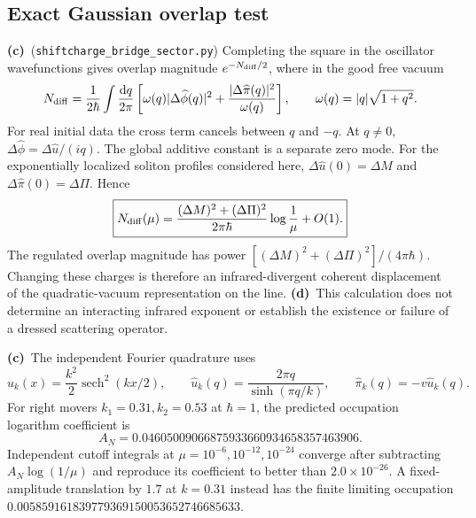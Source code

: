 \documentclass[11pt,a4paper]{article}
\newcommand{\C}{\textbf{(c)}\ }
\newcommand{\D}{\textbf{(d)}\ }
\newcommand{\dd}{\mathrm d}
\newcommand{\file}[1]{\nolinkurl{#1}}
\newcommand{\scs}{\file{shiftcharge_bridge_sector.py}}
\begin{document}
\subsection{Exact Gaussian overlap test}
\C (\scs) Completing the square in the oscillator wavefunctions
gives overlap magnitude $e^{-N_{\rm diff}/2}$, where in the good free
vacuum
\begin{equation}
 N_{\rm diff}=\frac1{2\hbar}\int\frac{\dd q}{2\pi}
 \left[\omega(q)|\Delta\widehat\phi(q)|^2+
 \frac{|\Delta\widehat\pi(q)|^2}{\omega(q)}\right],
 \qquad \omega(q)=|q|\sqrt{1+q^2}.
 \label{occupation}
\end{equation}
For real initial data the cross term cancels between $q$ and $-q$.
At $q\ne0$, $\Delta\widehat\phi=\Delta\widehat u/(iq)$.
The global additive constant is a separate zero mode.
For the exponentially localized soliton profiles considered here,
$\Delta\widehat u(0)=\Delta M$ and
$\Delta\widehat\pi(0)=\Delta\Pi$. Hence
\begin{equation}
 \boxed{
 N_{\rm diff}(\mu)=
 \frac{(\Delta M)^2+(\Delta\Pi)^2}{2\pi\hbar}
 \log\frac1\mu+O(1).}
 \label{ir-log}
\end{equation}
The regulated overlap magnitude has power
$[(\Delta M)^2+(\Delta\Pi)^2]/(4\pi\hbar)$.
Changing these charges is therefore an infrared-divergent coherent
displacement of the quadratic-vacuum representation on the line.
\D This calculation does not determine an interacting infrared exponent
or establish the existence or failure of a dressed scattering operator.

\C The independent Fourier quadrature uses
\begin{equation}
 u_k(x)=\frac{k^2}{2}\operatorname{sech}^2(kx/2),\qquad
 \widehat u_k(q)=\frac{2\pi q}{\sinh(\pi q/k)},\qquad
 \widehat\pi_k(q)=-v\widehat u_k(q).
 \label{fourier}
\end{equation}
For right movers $k_1=0.31,k_2=0.53$ at $\hbar=1$, the predicted
occupation logarithm coefficient is
\begin{equation}
 A_N=0.04605009066875933660934658357463906 .
\end{equation}
Independent cutoff integrals at $\mu=10^{-6},10^{-12},10^{-24}$ converge
after subtracting $A_N\log(1/\mu)$ and reproduce its coefficient to
better than $2.0\times10^{-26}$. A fixed-amplitude translation by $1.7$
at $k=0.31$ instead has the finite limiting occupation
$0.005859161839779369150053652746685633$.
\end{document}
